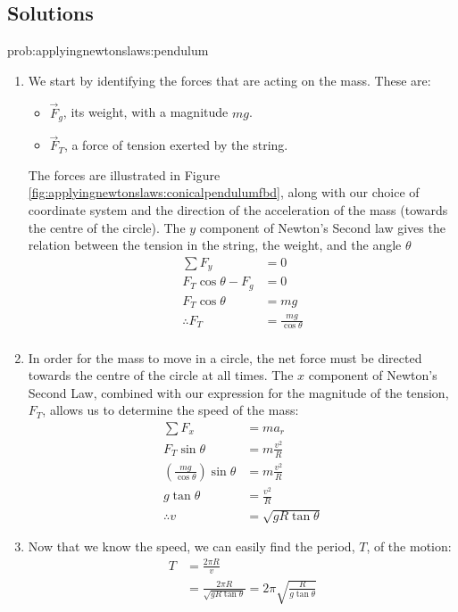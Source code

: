 \subsection{Solutions}
\begin{solution}{prob:applyingnewtonslaws:pendulum}\label{soln:applyingnewtonslaws:pendulum} 
\begin{enumerate}[label=\alph*)]
\item We start by identifying the forces that are acting on the mass. These are:
\begin{itemize}
\item $\vec F_g$, its weight, with a magnitude $mg$.
\item $\vec F_T$, a force of tension exerted by the string.
\end{itemize}
The forces are illustrated in Figure \ref{fig:applyingnewtonslaws:conicalpendulumfbd}, along with our choice of coordinate system and the direction of the acceleration of the mass (towards the centre of the circle).
The $y$ component of Newton's Second law gives the relation between the tension in the string, the weight, and the angle $\theta$
\begin{align*}
\sum F_y&=0 \\
F_T\cos\theta -F_g&=0 \\
F_T\cos\theta&=mg \\
\therefore F_T&=\frac{mg}{\cos\theta} \\
\end{align*}
\item In order for the mass to move in a circle, the net force must be directed towards the centre of the circle at all times. The $x$ component of Newton's Second Law, combined with our expression for the magnitude of the tension, $F_T$, allows us to determine the speed of the mass:
\begin{align*}
\sum F_x&=ma_r \\
F_T\sin\theta&=m\frac{v^2}{R}\\
\left(\frac{mg}{\cos\theta}\right)\sin\theta &=m\frac{v^2}{R}\\
g\tan\theta&=\frac{v^2}{R}\\
\therefore v &= \sqrt{gR\tan\theta}
\end{align*}
\item Now that we know the speed, we can easily find the period, $T$, of the motion:
\begin{align*}
T&=\frac{2\pi R}{v} \\
&=\frac{2\pi R}{\sqrt{gR\tan\theta }}=2\pi\sqrt{\frac{R}{g\tan\theta}}
\end{align*}

\end{enumerate}
\end{solution}

